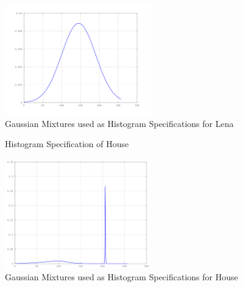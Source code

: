 \documentclass[journal]{IEEEtran}
\begin{document}
\begin{figure}[!h]
\centering
\includegraphics[width=2.5in]{../results/histspec/lena_spec.png}
\caption{Gaussian Mixtures used as Histogram Specifications for Lena}
\label{LenaSpec}
\end{figure}

\begin{figure}[!h]
\centering
{}
\caption{Histogram Specification of House}
\label{histSpecHouse}
\end{figure}


\begin{figure}[!h]
\centering
\includegraphics[width=2.5in]{../results/histspec/house_spec.png}
\caption{Gaussian Mixtures used as Histogram Specifications for House}
\label{HouseSpec}
\end{figure}
\end{document}
